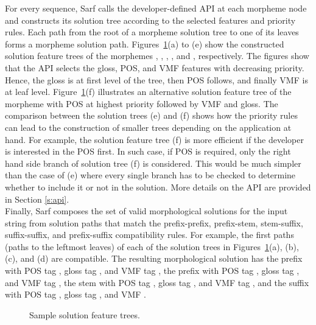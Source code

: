 For every sequence, Sarf calls the developer-defined API at each morpheme node
and constructs its solution  tree according to the selected features and priority rules. 
Each path from the root of a morpheme solution tree to one of its leaves forms a
morpheme solution path. 
Figures~\ref{f:strees}(a) to (e) show the constructed solution feature trees 
of the morphemes , , , , and , respectively. 
The figures show that the API selects the gloss, POS, and VMF 
features with decreasing priority. Hence, the gloss is at first level of the tree, then POS follows, and finally VMF is at leaf level. 
Figure~\ref{f:strees}(f) illustrates an alternative solution feature tree of 
the morpheme  with POS at highest priority followed by VMF and gloss. 
The comparison between the solution trees (e) and (f) shows 
how the priority rules can lead to the construction of smaller 
trees depending on the application at hand. 
For example, the solution feature tree (f) is more efficient 
if the developer is interested in the POS first. In such case, if  POS is required, only the right hand side branch of  solution tree (f) is considered. This would be much simpler than the case of (e) where every single branch has to be checked to determine whether to include it or not in the solution. More details on the API are provided in Section \ref{s:api}. \\
Finally, Sarf composes the set of valid morphological solutions for the input string from solution paths
that match the prefix-prefix, prefix-stem, stem-suffix, 
suffix-suffix, and prefix-suffix compatibility rules.
%
For example, the first paths (paths to the leftmost leaves) of each of the 
solution trees in Figures~\ref{f:strees}(a), (b), (c), and (d) are compatible.
The resulting morphological solution has the 
prefix  with POS tag , 
gloss tag , and VMF tag , 
the prefix  with POS tag , 
gloss tag , and VMF tag ,
the stem  with POS tag ,
gloss tag  , and VMF tag , 
and the suffix  with POS tag , 
gloss tag , and VMF .

\transfalse
\begin{figure}[tb]
\centering
\resizebox{.9\textwidth}{!}{ 
 
}
\caption{\label{f:strees}Sample solution feature trees.}
\end{figure}
